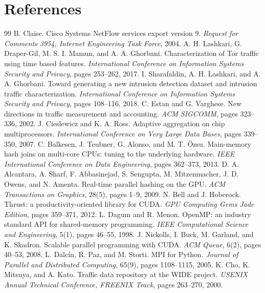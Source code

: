 \section*{References}
\begingroup
\footnotesize
\renewcommand{\section}[2]{}
\begin{thebibliography}{99}
\setlength{\itemsep}{1pt}
 B. Claise. Cisco Systems NetFlow services export version 9. \emph{Request for Comments 3954, Internet Engineering Task Force}, 2004.
 A. H. Lashkari, G. Draper-Gil, M. S. I. Mamun, and A. A. Ghorbani. Characterization of Tor traffic using time based features. \emph{International Conference on Information Systems Security and Privacy}, pages 253--262, 2017.
 I. Sharafaldin, A. H. Lashkari, and A. A. Ghorbani. Toward generating a new intrusion detection dataset and intrusion traffic characterization. \emph{International Conference on Information Systems Security and Privacy}, pages 108--116, 2018.
 C. Estan and G. Varghese. New directions in traffic measurement and accounting. \emph{ACM SIGCOMM}, pages 323--336, 2002.
 J. Cieslewicz and K. A. Ross. Adaptive aggregation on chip multiprocessors. \emph{International Conference on Very Large Data Bases}, pages 339--350, 2007.
 C. Balkesen, J. Teubner, G. Alonso, and M. T. \"Ozsu. Main-memory hash joins on multi-core CPUs: tuning to the underlying hardware. \emph{IEEE International Conference on Data Engineering}, pages 362--373, 2013.
 D. A. Alcantara, A. Sharf, F. Abbasinejad, S. Sengupta, M. Mitzenmacher, J. D. Owens, and N. Amenta. Real-time parallel hashing on the GPU. \emph{ACM Transactions on Graphics}, 28(5), pages 1--9, 2009.
 N. Bell and J. Hoberock. Thrust: a productivity-oriented library for CUDA. \emph{GPU Computing Gems Jade Edition}, pages 359--371, 2012.
 L. Dagum and R. Menon. OpenMP: an industry standard API for shared-memory programming. \emph{IEEE Computational Science and Engineering}, 5(1), pages 46--55, 1998.
 J. Nickolls, I. Buck, M. Garland, and K. Skadron. Scalable parallel programming with CUDA. \emph{ACM Queue}, 6(2), pages 40--53, 2008.
 L. Dalc\'in, R. Paz, and M. Storti. MPI for Python. \emph{Journal of Parallel and Distributed Computing}, 65(9), pages 1108--1115, 2005.
 K. Cho, K. Mitsuya, and A. Kato. Traffic data repository at the WIDE project. \emph{USENIX Annual Technical Conference, FREENIX Track}, pages 263--270, 2000.
\end{thebibliography}
\endgroup
